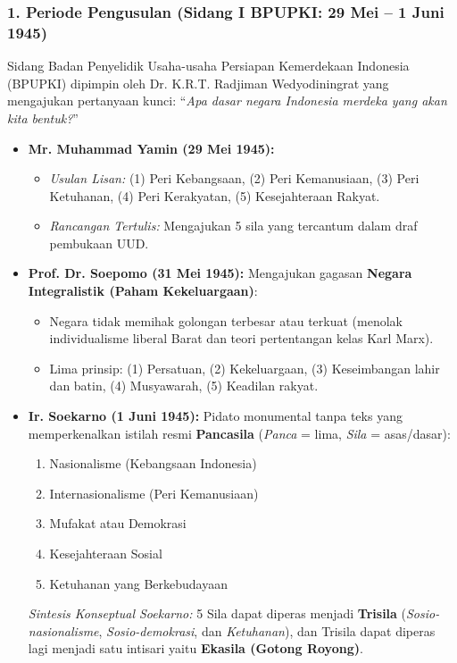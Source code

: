 \documentclass[10pt,a4paper]{article}
\begin{document}
\subsubsection{1. Periode Pengusulan (Sidang I BPUPKI: 29 Mei -- 1 Juni 1945)}
Sidang Badan Penyelidik Usaha-usaha Persiapan Kemerdekaan Indonesia (BPUPKI) dipimpin oleh Dr. K.R.T. Radjiman Wedyodiningrat yang mengajukan pertanyaan kunci: ``\textit{Apa dasar negara Indonesia merdeka yang akan kita bentuk?}''
\begin{itemize}
  \item \textbf{Mr. Muhammad Yamin (29 Mei 1945):}
    \begin{itemize}
      \item \textit{Usulan Lisan:} (1) Peri Kebangsaan, (2) Peri Kemanusiaan, (3) Peri Ketuhanan, (4) Peri Kerakyatan, (5) Kesejahteraan Rakyat.
      \item \textit{Rancangan Tertulis:} Mengajukan 5 sila yang tercantum dalam draf pembukaan UUD.
    \end{itemize}
  \item \textbf{Prof. Dr. Soepomo (31 Mei 1945):} Mengajukan gagasan \textbf{Negara Integralistik (Paham Kekeluargaan)}:
    \begin{itemize}
      \item Negara tidak memihak golongan terbesar atau terkuat (menolak individualisme liberal Barat dan teori pertentangan kelas Karl Marx).
      \item Lima prinsip: (1) Persatuan, (2) Kekeluargaan, (3) Keseimbangan lahir dan batin, (4) Musyawarah, (5) Keadilan rakyat.
    \end{itemize}
  \item \textbf{Ir. Soekarno (1 Juni 1945):} Pidato monumental tanpa teks yang memperkenalkan istilah resmi \textbf{Pancasila} (\textit{Panca} = lima, \textit{Sila} = asas/dasar):
    \begin{enumerate}
      \item Nasionalisme (Kebangsaan Indonesia)
      \item Internasionalisme (Peri Kemanusiaan)
      \item Mufakat atau Demokrasi
      \item Kesejahteraan Sosial
      \item Ketuhanan yang Berkebudayaan
    \end{enumerate}
    \textit{Sintesis Konseptual Soekarno:} 5 Sila dapat diperas menjadi \textbf{Trisila} (\textit{Sosio-nasionalisme}, \textit{Sosio-demokrasi}, dan \textit{Ketuhanan}), dan Trisila dapat diperas lagi menjadi satu intisari yaitu \textbf{Ekasila (Gotong Royong)}.
\end{itemize}
\end{document}
